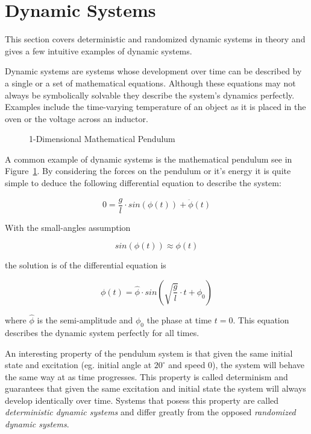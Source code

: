\section{Dynamic Systems}

This section covers deterministic and randomized dynamic systems in theory and gives a few intuitive examples of dynamic systems.

Dynamic systems are systems whose development over time can be described by a single or a set of mathematical equations. Although these equations may not always be symbolically solvable they describe the system's dynamics perfectly. Examples include the time-varying temperature of an object as it is placed in the oven or the voltage across an inductor.

\begin{figure}
\begin{center}
\end{center}
\caption{1-Dimensional Mathematical Pendulum}
\label{1dpendulum}
\end{figure}

A common example of dynamic systems is the mathematical pendulum see in Figure~\ref{1dpendulum}. By considering the forces on the pendulum or it's energy it is quite simple to deduce the following differential equation to describe the system:

\[
0 = \frac{g}{l}\cdot sin(\phi(t))+\ddot{\phi}(t)
\]

With the small-angles assumption

\[
sin(\phi(t))\approx\phi(t)
\]

the solution is of the differential equation is

\[
\phi(t) = \hat{\phi} \cdot sin( \sqrt{\frac{g}{l}} \cdot t + {\phi}_0)
\]

where $\hat{\phi}$ is the semi-amplitude and ${\phi}_0$ the phase at time $t=0$. This equation describes the dynamic system perfectly for all times.

An interesting property of the pendulum system is that given the same initial state and excitation (eg. initial angle at $20 ^{\circ}$ and speed $0$), the system will behave the same way at as time progresses. This property is called determinism and guarantees that given the same excitation and initial state the system will always develop identically over time. Systems that posess this property are called \textit{deterministic dynamic systems} and differ greatly from the opposed \textit{randomized dynamic systems}.

